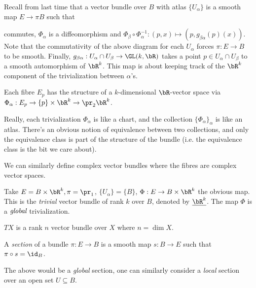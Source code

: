 Recall from last time that a vector bundle over $B$ with atlas $\{U_\alpha\}$ is a smooth map $E\to{\pi} B$ such that
\begin{center}
\end{center}
commutes, $\Phi_\alpha$ is a diffeomorphism and $\Phi_\beta \circ \Phi_\alpha^{-1}:(p,x) \mapsto (p,g_{\beta\alpha}(p)(x))$. Note that the commutativity of the above diagram for each $U_\alpha$ forces $\pi:E\to B$ to be smooth. Finally, $g_{\beta\alpha}:U_\alpha \cap U_\beta \to \GL(k,\bR)$ takes a point $p \in U_{\alpha}\cap U_\beta$ to a smooth automorphism of $\bR^k$. This map is about keeping track of the $\bR^k$ component of the trivialization between $\alpha$'s.

\begin{rmk}\label{rmk:lec2.5}
	Each fibre $E_p$ has the structure of a $k$-dimensional $\bR$-vector space via $\Phi_\alpha:E_p\to \{p\}\times \bR^k\to{\pr_2}\bR^k$.
\end{rmk}

\begin{rmk}\label{rmk:lec2.6}
	Really, each trivialization $\Phi_\alpha$ is like a chart, and the collection $\{\Phi_\alpha\}_{\alpha}$ is like an atlas. There's an obvious notion of equivalence between two collections, and only the equivalence class is part of the structure of the bundle (i.e. the equivalence class is the bit we care about).
\end{rmk}

\begin{rmk}\label{rmk:lec2.7}
	We can similarly define complex vector bundles where the fibres are complex vector spaces.
\end{rmk}
\begin{example}\label{example:lec2.8}
	Take $E = B\times \bR^k, \pi = \pr_1$, $\{U_\alpha\} = \{B\}$, $\Phi:E\to B\times \bR^k$ the obvious map. This is the \emph{trivial} vector bundle of rank $k$ over $B$, denoted by $\underline{\bR^k}$. The map $\Phi$ is a $\emph{global}$ trivialization.
\end{example}
\begin{example}\label{example:lec2.9}
	$TX$ is a rank $n$ vector bundle over $X$ where $n = \dim X$.
\end{example}
\begin{defn}\label{defn:section-of-bundle}
	A \emph{section} of a bundle $\pi:E\to B$ is a smooth map $s:B\to E$ such that $\pi\circ s = \id_B$.
\end{defn}
The above would be a \emph{global} section, one can similarly consider a \emph{local} section over an open set $U \subseteq B$.


